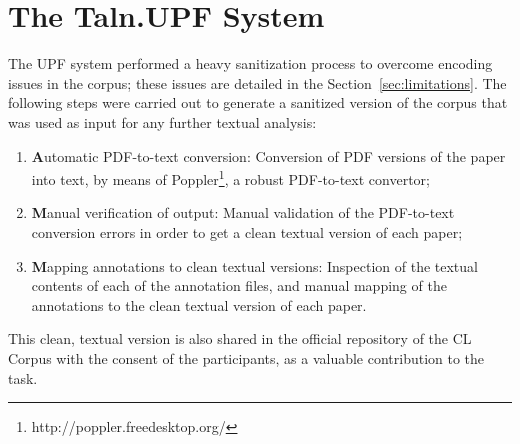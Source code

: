 \documentclass[11pt]{article}
\begin{document}

\section{The Taln.UPF System}

The UPF system performed a heavy sanitization process to overcome encoding issues in the corpus; these issues are detailed in the Section~\ref{sec:limitations}. The following steps were carried out to generate a sanitized version of the corpus that was used as input for any further textual analysis:
\begin{enumerate}
\vspace{-.3cm}
\item {\textbf Automatic PDF-to-text conversion}: Conversion of PDF versions of the paper into text, by means of Poppler\footnote{http://poppler.freedesktop.org/}, a robust PDF-to-text convertor;
\vspace{-.3cm}
\item {\textbf Manual verification of output}: Manual validation of the PDF-to-text conversion errors in order to get a clean textual version of each paper;
\vspace{-.3cm}
\item {\textbf Mapping annotations to clean textual versions}: Inspection of the textual contents of each of the annotation files, and manual mapping of the annotations to the clean textual version of each paper.
\vspace{-.3cm}
\end{enumerate}
This clean, textual version is also shared in the official repository of the CL Corpus with the consent of the participants, as a valuable contribution to the task.
\end{document}
